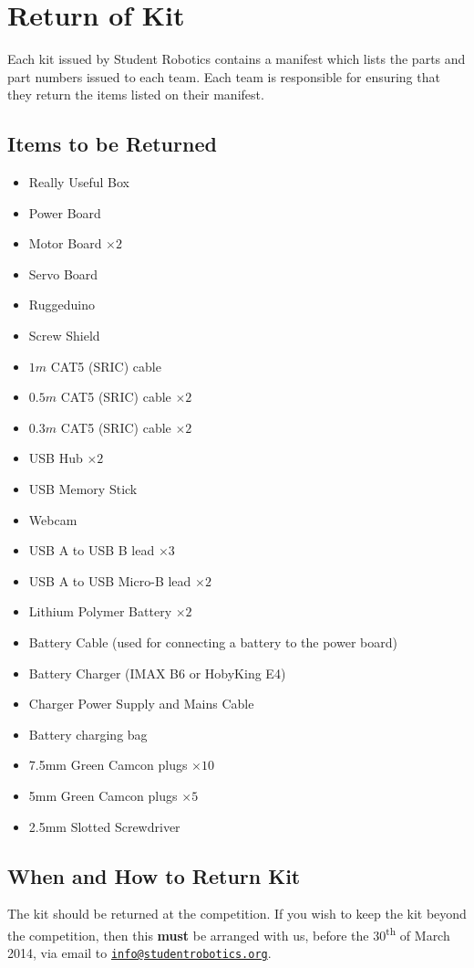 \section {Return of Kit}
\label{sec:kit-return}

Each kit issued by Student Robotics contains a manifest which lists the parts and part numbers issued to each team.
Each team is responsible for ensuring that they return the items listed on their manifest.

\subsection {Items to be Returned}

\begin{itemize}
 \setlength{\itemsep}{0.3em}
 \item Really Useful Box

 \item Power Board
 \item Motor Board $\times 2$
 \item Servo Board
 \item Ruggeduino
 \item Screw Shield
 \item $  1m$ CAT5 (SRIC) cable
 \item $0.5m$ CAT5 (SRIC) cable $\times 2$
 \item $0.3m$ CAT5 (SRIC) cable $\times 2$

 \item USB Hub $\times 2$
 \item USB Memory Stick
 \item Webcam
 \item USB A to USB B lead $\times 3$
 \item USB A to USB Micro-B lead $\times 2$

 \item Lithium Polymer Battery $\times 2$
 \item Battery Cable (used for connecting a battery to the power board)
 \item Battery Charger (IMAX B6 or HobyKing E4)
 \item Charger Power Supply and Mains Cable
 \item Battery charging bag

 \item 7.5mm Green Camcon plugs $\times 10$
 \item 5mm Green Camcon plugs $\times 5$
 \item 2.5mm Slotted Screwdriver
\end{itemize}

\subsection {When and How to Return Kit}

The kit should be returned at the competition.
If you wish to keep the kit beyond the competition, then this \textbf{must} be arranged with us,
 before the 30\textsuperscript{th} of March 2014, via email to \href{mailto:info@studentrobotics.org}{\nolinkurl{info@studentrobotics.org}}.
